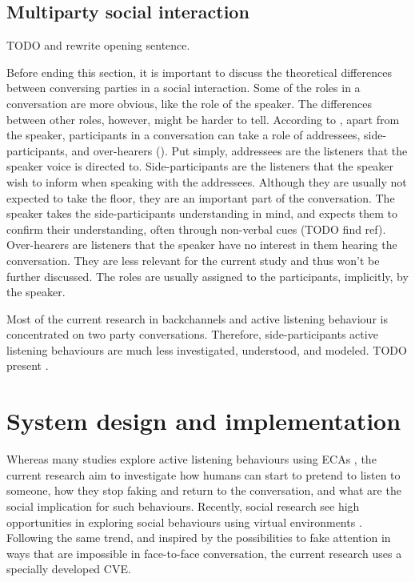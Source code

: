 \documentclass[]{simple-thesis}
\begin{document}
\section{Multiparty social interaction}

TODO \citep{Goodwin1979, Healey2009, Battersby2010} and rewrite opening sentence.

Before ending this section, it is important to discuss the theoretical differences between conversing parties in a social interaction.
Some of the roles in a conversation are more obvious, like the role of the speaker.
The differences between other roles, however, might be harder to tell.
According to \citeauthor{Clark1982}, apart from the speaker, participants in a conversation can take a role of addressees, side-participants, and over-hearers (\citeyear{Clark1982}).
Put simply, addressees are the listeners that the speaker voice is directed to.
Side-participants are the listeners that the speaker wish to inform when speaking with the addressees.
Although they are usually not expected to take the floor, they are an important part of the conversation.
The speaker takes the side-participants understanding in mind, and expects them to confirm their understanding, often through non-verbal cues (TODO find ref).
Over-hearers are listeners that the speaker have no interest in them hearing the conversation.
They are less relevant for the current study and thus won't be further discussed.
The roles are usually assigned to the participants, implicitly, by the speaker.

Most of the current research in backchannels and active listening behaviour is concentrated on two party conversations.
Therefore, side-participants active listening behaviours are much less investigated, understood, and modeled.
TODO present \citep{Matsusaka2003, Fujie2009}.


\chapter{System design and implementation}\label{system_design_and_implementation}

Whereas many studies explore active listening behaviours using ECAs \citep{Nishimura2007, Bevacqua2008, Gratch2007, Huang2011, Lee2006, Poppe2013}, the current research aim to investigate how humans can start to pretend to listen to someone, how they stop faking and return to the conversation, and what are the social implication for such behaviours.
Recently, social research see high opportunities in exploring social behaviours using virtual environments \citep{Loomis1999}.
Following the same trend, and inspired by the possibilities to fake attention in ways that are impossible in face-to-face conversation, the current research uses a specially developed CVE.
\end{document}
